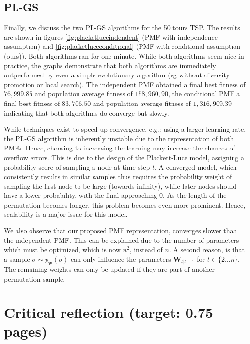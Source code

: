 \documentclass[a4paper,10pt]{article}
\newcommand{\matr}[1]{\mathbf{#1}}
\begin{document}
\subsection{PL-GS}
Finally, we discuss the two PL-GS algorithms for the 50 tours TSP. The results are shown in figures \ref{fig:placketluceindendent} (PMF with independence assumption) and \ref{fig:placketluceconditional} (PMF with conditional assumption (ours)). Both algorithms ran for one minute. While both algorithms seem nice in practice, the graphs demonstrate that both algorithms are immediately outperformed by even a simple evolutionary algorithm (eg without diversity promotion or local search). The independent PMF obtained a final best fitness of $76,999.85$ and population average fitness of $158,960,90$, the conditional PMF a final best fitness of $83,706.50$ and population average fitness of $1,316,909.39$ indicating that both algorithms do converge but slowly.

While techniques exist to speed up convergence, e.g.: using a larger learning rate, the PL-GS algorithm is inherently unstable due to the representation of both PMFs. Hence, choosing to increasing the learning may increase the chances of overflow errors. This is due to the design of the Plackett-Luce model, assigning a probability score of sampling a node at time step $t$. A converged model, which consistently results in similar samples thus requires the probability weight of sampling the first node to be large (towards infinity), while later nodes should have a lower probability, with the final approaching 0. As the length of the permutation becomes longer, this problem becomes even more prominent. Hence, scalability is a major issue for this model.

We also observe that our proposed PMF representation, converges slower than the independent PMF. This can be explained due to the number of parameters which must be optimized, which is now $n^2$, instead of $n$. A second reason, is that a sample $\sigma \sim p_\matr{w}(\sigma)$ can only influence the parameters $\matr{W}_{t|t-1}$ for $t \in \{2 \dots n\}$. The remaining weights can only be updated if they are part of another permutation sample.


	


\section{Critical reflection (target: 0.75 pages)}
\end{document}
